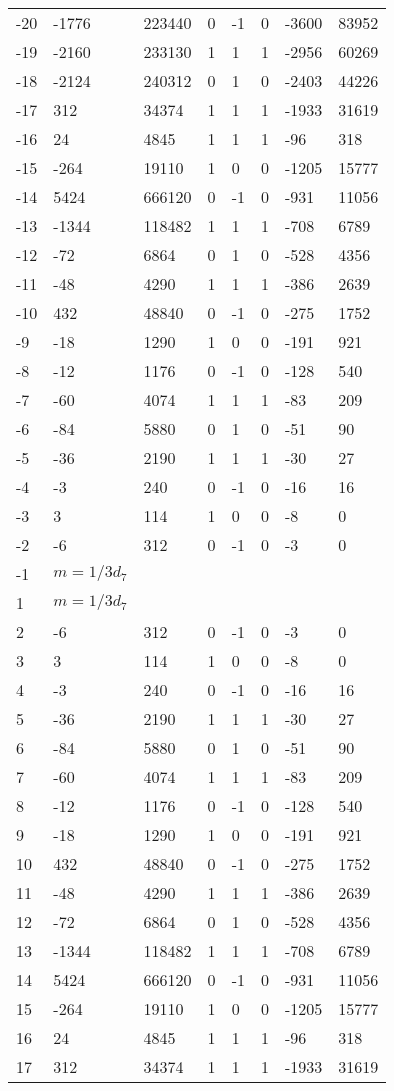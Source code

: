 \documentclass{amsart}
\begin{document}
\begin{longtable}{|l|l|l|lllll|}
-20&-1776&223440&0&-1&0&-3600&83952\\
-19&-2160&233130&1&1&1&-2956&60269\\
-18&-2124&240312&0&1&0&-2403&44226\\
-17&312&34374&1&1&1&-1933&31619\\
-16&24&4845&1&1&1&-96&318\\
-15&-264&19110&1&0&0&-1205&15777\\
-14&5424&666120&0&-1&0&-931&11056\\
-13&-1344&118482&1&1&1&-708&6789\\
-12&-72&6864&0&1&0&-528&4356\\
-11&-48&4290&1&1&1&-386&2639\\
-10&432&48840&0&-1&0&-275&1752\\
-9&-18&1290&1&0&0&-191&921\\
-8&-12&1176&0&-1&0&-128&540\\
-7&-60&4074&1&1&1&-83&209\\
-6&-84&5880&0&1&0&-51&90\\
-5&-36&2190&1&1&1&-30&27\\
-4&-3&240&0&-1&0&-16&16\\
-3&3&114&1&0&0&-8&0\\
-2&-6&312&0&-1&0&-3&0\\
-1&$m=1/3d_{7}$&&\multicolumn{5}{c|}{}\\
1&$m=1/3d_{7}$&&\multicolumn{5}{c|}{}\\
2&-6&312&0&-1&0&-3&0\\
3&3&114&1&0&0&-8&0\\
4&-3&240&0&-1&0&-16&16\\
5&-36&2190&1&1&1&-30&27\\
6&-84&5880&0&1&0&-51&90\\
7&-60&4074&1&1&1&-83&209\\
8&-12&1176&0&-1&0&-128&540\\
9&-18&1290&1&0&0&-191&921\\
10&432&48840&0&-1&0&-275&1752\\
11&-48&4290&1&1&1&-386&2639\\
12&-72&6864&0&1&0&-528&4356\\
13&-1344&118482&1&1&1&-708&6789\\
14&5424&666120&0&-1&0&-931&11056\\
15&-264&19110&1&0&0&-1205&15777\\
16&24&4845&1&1&1&-96&318\\
17&312&34374&1&1&1&-1933&31619\\

\end{longtable}
\end{document}
